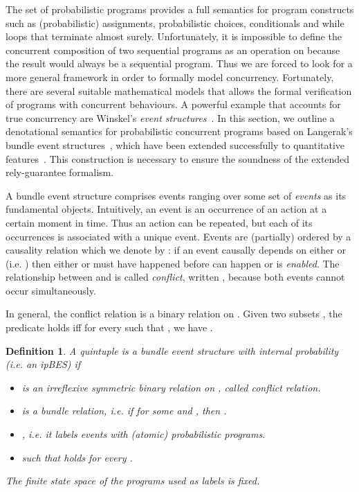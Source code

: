 \documentclass[review]{elsart}
\newtheorem{definition}{Definition}[section]
\newcommand{\Tx}{\color{orange}}
\begin{document}
The set  of probabilistic programs provides a full semantics for program constructs such as (probabilistic) assignments, probabilistic choices, conditionals and while loops that terminate almost surely. Unfortunately, it is impossible to define the concurrent composition of two sequential programs as an operation on  because the result would always be a sequential program. Thus we are forced to look for a more general framework in order to formally model concurrency. Fortunately, there are several suitable mathematical models that allows the formal verification of programs with concurrent behaviours. A powerful example that accounts for true concurrency are Winskel's \emph{event structures}~\cite{Win80,Win86}. In this section, we outline a denotational semantics for probabilistic concurrent programs based on Langerak's bundle event structures~\cite{Lan92}, which have been extended successfully to quantitative features~\cite{Kat93,Kat96,Var03}. This construction is necessary to ensure the soundness of the extended rely-guarantee formalism.

{\Tx
A bundle event structure comprises events ranging over some set  of \emph{events} as its fundamental objects. Intuitively, an event is an occurrence of an action at a certain moment in time. Thus an action can be repeated, but each of its occurrences is associated with a unique event. Events are (partially) ordered by a causality relation which we denote by : if an event  causally depends on either  or  (i.e. ) then either  or  must have happened before  can happen or is \emph{enabled}. The relationship between  and  is called \emph{conflict}, written , because both events cannot occur simultaneously.
}

In general, the conflict relation  is a binary relation on . Given two subsets , the predicate  holds iff for every  such that , we have . 

\begin{definition}\label{def:ipbes}
A quintuple  is a \emph{bundle event structure with internal probability} (i.e. an ipBES) if 
\begin{itemize}
\item  is an irreflexive symmetric binary relation on , called \emph{conflict relation}. 
\item  is a \emph{bundle relation}, i.e. if  for some  and , then . 
\item , i.e. it labels events with (atomic) probabilistic programs.
\item  such that  holds  for every .
\end{itemize}
 
The finite state space  of the programs used as labels is fixed.
\end{definition} 
\end{document}
